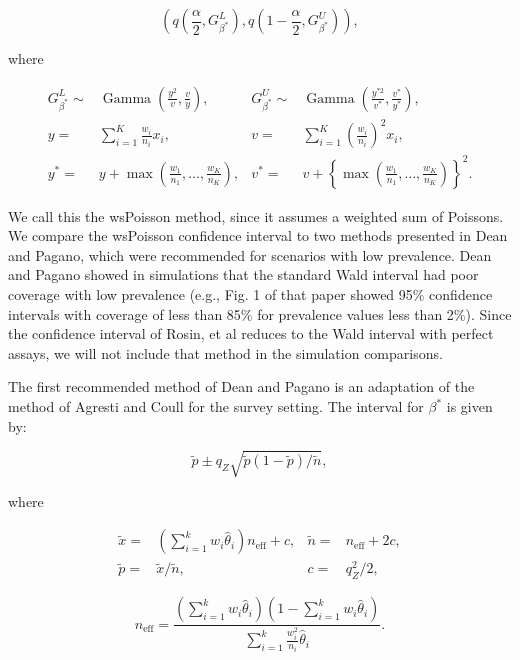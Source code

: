 \begin{equation}
    \left( q\left( \frac{\alpha}{2}, G_{\beta^*}^L \right), q \left( 1 - \frac{\alpha}{2}, G_{\beta^*}^U \right) \right),
\end{equation}


where

\begin{align*}
    G_{\beta^*}^L \sim& \operatorname{Gamma}\left( \frac{y^2}{v}, \frac{v}{y} \right), &
    G_{\beta^*}^U \sim& \operatorname{Gamma}\left( \frac{y^{*2}}{v^*}, \frac{v^*}{y^*} \right), \\
    y =& \sum_{i=1}^K \frac{w_i}{n_i} x_i, &
    v =& \sum_{i=1}^K \left( \frac{w_i}{n_i}\right)^2 x_i, \\
    y^* =& y + \max\left(\frac{w_1}{n_1}, \ldots, \frac{w_K}{n_K} \right), &
    v^* =& v + \left\{ \max\left(\frac{w_1}{n_1}, \ldots, \frac{w_K}{n_K} \right) \right\}^2.
\end{align*}

We call this the wsPoisson method, since it assumes a weighted sum of Poissons.
We compare the wsPoisson confidence interval to two methods presented in Dean and Pagano,\cite{Dean:2015} which were recommended for scenarios with low prevalence.
Dean and Pagano showed in simulations that the standard Wald interval had poor coverage with low prevalence (e.g., Fig. 1 of that paper showed 95\% confidence intervals with coverage of less than 85\% for prevalence values less than 2\%).
Since the confidence interval of Rosin, et al\cite{rosin2021estimating} reduces to the Wald interval with perfect assays, we will not include that method in the simulation comparisons.

The first recommended method of Dean and Pagano is an adaptation of the method of Agresti and Coull\cite{AgrestiCoull} for the survey setting.
The interval for \( \beta^* \) is given by:

\begin{equation}
    \tilde{p} \pm q_Z \sqrt{\tilde{p}(1 - \tilde{p}) / \tilde{n}},
\end{equation}

where


\begin{align*}
   \tilde{x} =& \left( \sum_{i=1}^k w_i \hat{\theta}_i \right) n_{\text{eff}} + c, &
   \tilde{n} =& n_{\text{eff}} + 2c, \\
    \tilde{p} =& \tilde{x} / \tilde{n}, &
   c =& q_Z^2/2,
\end{align*}

\begin{equation}
   n_{\text{eff}} = \frac{\left( \sum_{i=1}^k w_i \hat{\theta}_i \right) \left(1 - \sum_{i=1}^k w_i \hat{\theta}_i \right)}{\sum_{i=1}^k \frac{w_i^2}{n_i}\hat{\theta}_i}.
   \label{eq:neff}
\end{equation}

